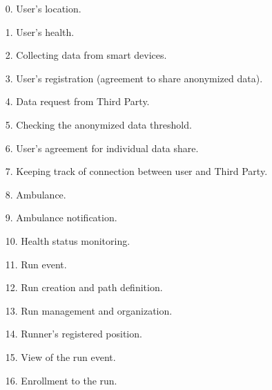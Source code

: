 \documentclass[a4paper]{article}
\begin{document}
\begin{enumerate} \itemsep=2pt
    \item [0.] User's location.
    \item [1.] User's health.
    \item [2.] Collecting data from smart devices.
    \item [3.] User's registration (agreement to share anonymized data).
    \item [4.] Data request from Third Party.
    \item [5.] Checking the anonymized data threshold.
    \item [6.] User's agreement for individual data share.
    \item [7.] Keeping track of connection between user and Third Party.
    \item [8.] Ambulance.
    \item [9.] Ambulance notification.
    \item [10.] Health status monitoring.
    \item [11.] Run event.
    \item [12.] Run creation and path definition.
    \item [13.] Run management and organization.
    \item [14.] Runner's registered position.
    \item [15.] View of the run event.
    \item [16.] Enrollment to the run.
\end{enumerate}

\clearpage
\end{document}
